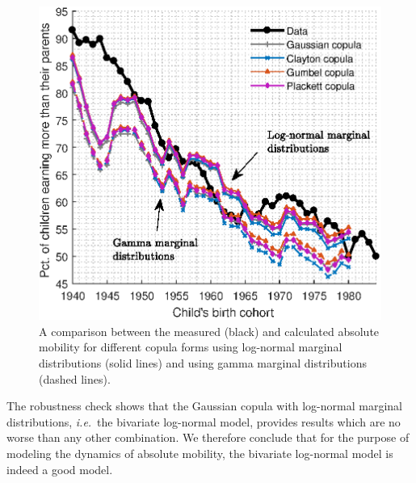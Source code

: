 \documentclass[12pt]{article}
\newcommand{\ie}{{\it i.e.}\ }
\newcommand{\flabel}[1]{\label{fig:#1}}
\numberwithin{equation}{section}
\begin{document}
\begin{figure}[!htb]
\centering
\includegraphics[width=1.0\textwidth]{./figs/copulas3.eps}
\caption{A comparison between the measured (black) and calculated absolute mobility for different copula forms using log-normal marginal distributions (solid lines) and using gamma marginal distributions (dashed lines).}
\flabel{copulas1}
\end{figure}

The robustness check shows that the Gaussian copula with log-normal marginal distributions, \ie the bivariate log-normal model, provides results which are no worse than any other combination. We therefore conclude that for the purpose of modeling the dynamics of absolute mobility, the bivariate log-normal model is indeed a good model.
\end{document}

